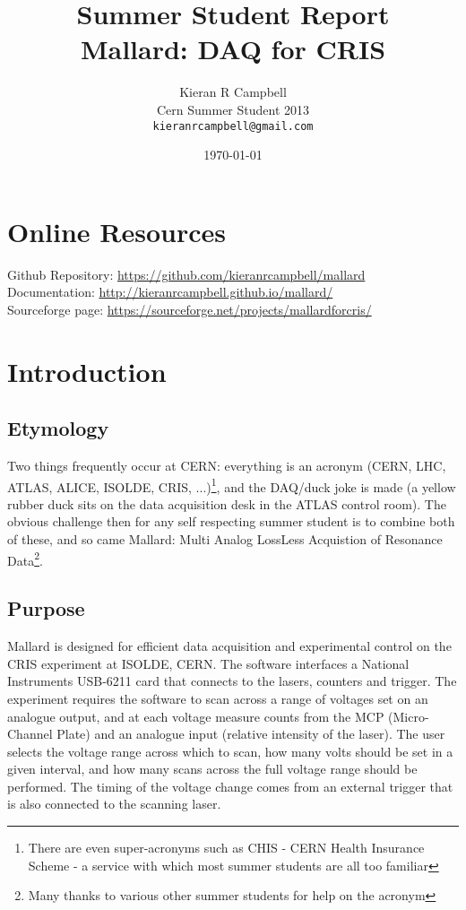 \documentclass[10pt,a4paper]{article}
\begin{document}
\author{Kieran R Campbell\\
		Cern Summer Student 2013\\
		\texttt{kieranrcampbell@gmail.com}}
\date{\today}
\title{Summer Student Report\\
		Mallard: DAQ for CRIS}
\maketitle
\tableofcontents
\newpage
\section{Online Resources}
	Github Repository: \url{https://github.com/kieranrcampbell/mallard} \\

Documentation: \url{http://kieranrcampbell.github.io/mallard/} \\

Sourceforge page: \url{https://sourceforge.net/projects/mallardforcris/} \\

\section{Introduction}
\subsection{Etymology}
Two things frequently occur at CERN: everything is an acronym (CERN, LHC, ATLAS, ALICE, ISOLDE, CRIS, ...)\footnote{There are even super-acronyms such as CHIS - CERN Health Insurance Scheme - a service with which most summer students are all too familiar}, and the DAQ/duck joke is made (a yellow rubber duck sits on the data acquisition desk in the ATLAS control room). The obvious challenge then for any self respecting summer student is to combine both of these, and so came Mallard: Multi Analog LossLess Acquistion of Resonance Data\footnote{Many thanks to various other summer students for help on the acronym}.
\subsection{Purpose}
Mallard is designed for efficient data acquisition and experimental control on the CRIS experiment at ISOLDE, CERN. The software interfaces a National Instruments USB-6211 card that connects to the lasers, counters and trigger. The experiment requires the software to scan across a range of voltages set on an analogue output, and at each voltage measure counts from the MCP (Micro-Channel Plate) and an analogue input (relative intensity of the laser). The user selects the voltage range across which to scan, how many volts should be set in a given interval, and how many scans across the full voltage range should be performed. The timing of the voltage change comes from an external trigger that is also connected to the scanning laser. \\
\end{document}
